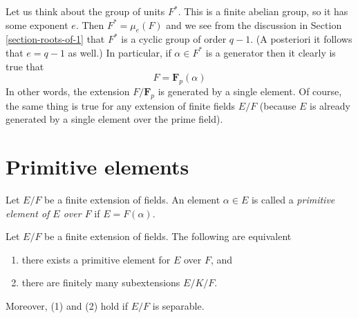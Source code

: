 \medskip\noindent
Let us think about the group of units $F^*$. This is a finite abelian
group, so it has some exponent $e$. Then $F^* = \mu_e(F)$ and we see
from the discussion in Section \ref{section-roots-of-1} that $F^*$
is a cyclic group of order $q - 1$. (A posteriori it follows that
$e = q - 1$ as well.) In particular, if $\alpha \in F^*$ is a generator
then it clearly is true that
$$
F = \mathbf{F}_p(\alpha)
$$
In other words, the extension $F/\mathbf{F}_p$ is generated by a single
element. Of course, the same thing is true for any extension of finite
fields $E/F$ (because $E$ is already generated by a single element over
the prime field).





\section{Primitive elements}
\label{section-primitive-element}

\noindent
Let $E/F$ be a finite extension of fields. An element $\alpha \in E$
is called a {\it primitive element of $E$ over $F$} if $E = F(\alpha)$.

\begin{lemma}
\label{lemma-primitive-element}
Let $E/F$ be a finite extension of fields. The following are equivalent
\begin{enumerate}
\item there exists a primitive element for $E$ over $F$, and
\item there are finitely many subextensions $E/K/F$.
\end{enumerate}
Moreover, (1) and (2) hold if $E/F$ is separable.
\end{lemma}


